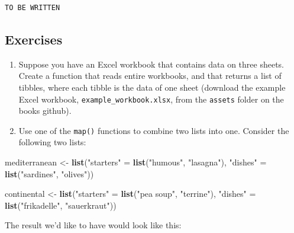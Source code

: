\documentclass[]{gitbook}
\newenvironment{Shaded}{\begin{snugshade}}{\end{snugshade}}
\newcommand{\KeywordTok}[1]{\textcolor[rgb]{0.13,0.29,0.53}{\textbf{#1}}}
\newcommand{\NormalTok}[1]{#1}
\newcommand{\StringTok}[1]{\textcolor[rgb]{0.31,0.60,0.02}{#1}}
\begin{document}
\begin{verbatim}
TO BE WRITTEN
\end{verbatim}

\hypertarget{exercises-6}{%
\subsection{Exercises}\label{exercises-6}}

\begin{enumerate}
\def\labelenumi{\arabic{enumi}.}
\item
  Suppose you have an Excel workbook that contains data on three sheets. Create a function that
  reads entire workbooks, and that returns a list of tibbles, where each tibble is the data of one
  sheet (download the example Excel workbook, \texttt{example\_workbook.xlsx}, from the \texttt{assets} folder on
  the books github).
\item
  Use one of the \texttt{map()} functions to combine two lists into one. Consider the following two lists:
\end{enumerate}

\begin{Shaded}
\begin{Highlighting}[]
\NormalTok{mediterranean <-}\StringTok{ }\KeywordTok{list}\NormalTok{(}\StringTok{"starters"}\NormalTok{ =}\StringTok{ }\KeywordTok{list}\NormalTok{(}\StringTok{"humous"}\NormalTok{, }\StringTok{"lasagna"}\NormalTok{), }\StringTok{"dishes"}\NormalTok{ =}\StringTok{ }\KeywordTok{list}\NormalTok{(}\StringTok{"sardines"}\NormalTok{, }\StringTok{"olives"}\NormalTok{))}

\NormalTok{continental <-}\StringTok{ }\KeywordTok{list}\NormalTok{(}\StringTok{"starters"}\NormalTok{ =}\StringTok{ }\KeywordTok{list}\NormalTok{(}\StringTok{"pea soup"}\NormalTok{, }\StringTok{"terrine"}\NormalTok{), }\StringTok{"dishes"}\NormalTok{ =}\StringTok{ }\KeywordTok{list}\NormalTok{(}\StringTok{"frikadelle"}\NormalTok{, }\StringTok{"sauerkraut"}\NormalTok{))}
\end{Highlighting}
\end{Shaded}

The result we'd like to have would look like this:
\end{document}
